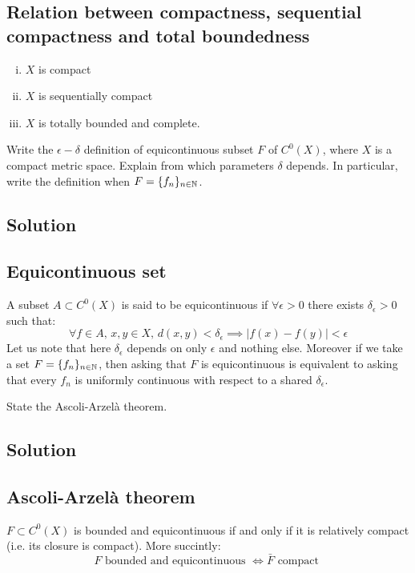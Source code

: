 \subsection{Relation between compactness, sequential compactness and total boundedness} \label{compact:altdef}
\tfae
\begin{enumerate}[i)]
    \item $X$ is compact
    \item $X$ is sequentially compact
    \item $X$ is totally bounded and complete.
\end{enumerate}


\question
Write the $\epsilon-\delta$ definition of equicontinuous subset $F$ of $C^0(X)$, where $X$ is a compact metric space. Explain from which parameters $\delta$ depends. In particular, write the definition when $F = \{f_n\}_{n\in\mathbb{N}}$.

\subsection*{Solution}

\subsection{Equicontinuous set}
A subset $A\subset C^0(X)$ is said to be equicontinuous if $\forall\epsilon>0$ there exists $\delta_\epsilon>0$ such that:
\[
    \forall f \in A, \, x,y \in X, \, d(x,y)<\delta_\epsilon \implies |f(x) - f(y)| < \epsilon
\]
Let us note that here $\delta_\epsilon$ depends on only $\epsilon$ and nothing else.
Moreover if we take a set $F=\{f_n\}_{n\in\mathbb{N}}$, then  asking that $F$ is equicontinuous is equivalent to asking that every $f_n$ is uniformly continuous with respect to a shared $\delta_\epsilon$.


\question
State the Ascoli-Arzelà theorem.

\subsection*{Solution}

\subsection{Ascoli-Arzelà theorem}
$F\subset C^0(X)$ is bounded and equicontinuous if and only if it is relatively compact (i.e. its closure is compact). More succintly:
\[
    F \text{ bounded and equicontinuous } \iff \bar{F} \text{ compact }    
\]

